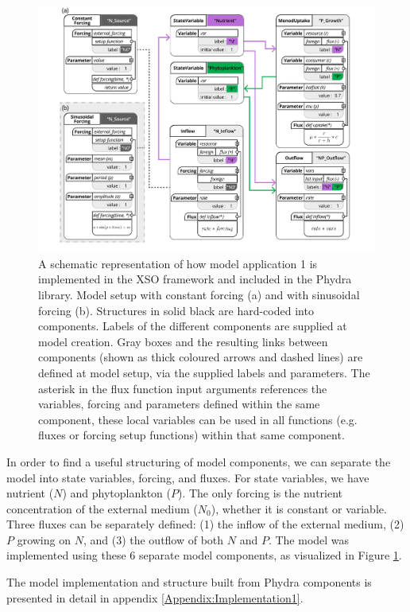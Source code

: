\documentclass[journal abbreviation, manuscript]{copernicus}
\begin{document}
\begin{figure}[t]
\includegraphics[width=15cm]{Figures/firstdraft_schematics/code_schematics/Chemostat.pdf}
\caption{A schematic representation of how model application 1 is implemented in the XSO framework and included in the Phydra library. Model setup with constant forcing (a) and with sinusoidal forcing (b). Structures in solid black are hard-coded into components. Labels of the different components are supplied at model creation. Gray boxes and the resulting links between components (shown as thick coloured arrows and dashed lines) are defined at model setup, via the supplied labels and parameters. The asterisk in the flux function input arguments references the variables, forcing and parameters defined within the same component, these local variables can be used in all functions (e.g. fluxes or forcing setup functions) within that same component.}
\label{Figure:CodeSchematics_1}
\end{figure}

In order to find a useful structuring of model components, we can separate the model into state variables, forcing, and fluxes. For state variables, we have nutrient ($N$) and phytoplankton ($P$). The only forcing is the nutrient concentration of the external medium ($N_0$), whether it is constant or variable. Three fluxes can be separately defined: (1) the inflow of the external medium, (2) $P$ growing on $N$, and (3) the outflow of both $N$ and $P$.
The model was implemented using these 6 separate model components, as visualized in Figure \ref{Figure:CodeSchematics_1}.

The model implementation and structure built from Phydra components is presented in detail in appendix \ref{Appendix:Implementation1}.
\end{document}
